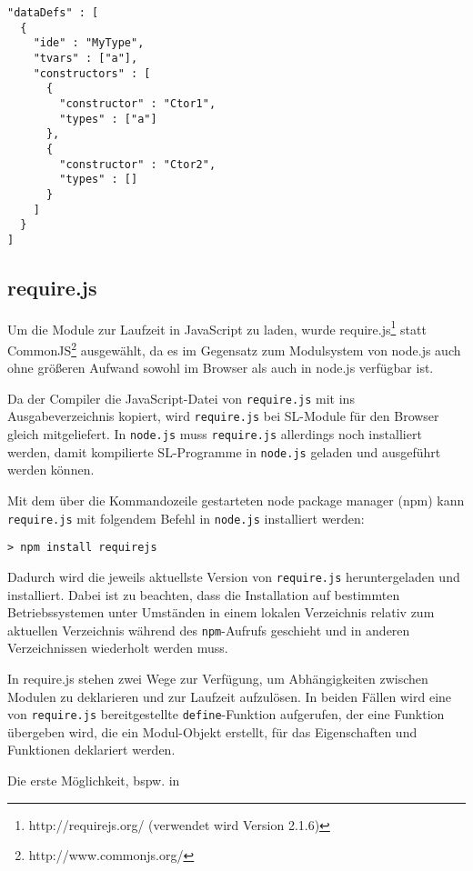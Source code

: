 \documentclass[runningheads]{llncs}
\begin{document}
\begin{verbatim}
"dataDefs" : [
  {
    "ide" : "MyType",
    "tvars" : ["a"],
    "constructors" : [
      {
        "constructor" : "Ctor1",
        "types" : ["a"]
      },
      {
        "constructor" : "Ctor2",
        "types" : []
      }
    ]
  }
]
\end{verbatim}

\subsection{require.js}
\label{sec:compReq}

Um die Module zur Laufzeit in JavaScript zu laden, wurde
require.js\footnote{http://requirejs.org/ (verwendet wird Version 2.1.6)}
statt CommonJS\footnote{http://www.commonjs.org/} ausgewählt, da es im
Gegensatz zum Modulsystem von node.js auch ohne größeren Aufwand
sowohl im Browser als auch in node.js verfügbar ist.

Da der Compiler die JavaScript-Datei von \texttt{require.js} mit ins
Ausgabeverzeichnis kopiert, wird \texttt{require.js} bei SL-Module
für den Browser gleich mitgeliefert. In \texttt{node.js} muss
\texttt{require.js} allerdings noch installiert werden, damit
kompilierte SL-Programme in \texttt{node.js} geladen und ausgeführt
werden können.

Mit dem über die Kommandozeile gestarteten node package manager (npm) kann
\texttt{require.js} mit folgendem Befehl in \texttt{node.js}
installiert werden:

\begin{verbatim}
> npm install requirejs
\end{verbatim}

Dadurch wird die jeweils aktuellste Version von \texttt{require.js} heruntergeladen
und installiert. Dabei ist zu beachten, dass die Installation auf
bestimmten Betriebssystemen unter Umständen in einem lokalen Verzeichnis
relativ zum aktuellen Verzeichnis während des \texttt{npm}-Aufrufs
geschieht und in anderen Verzeichnissen wiederholt werden muss.

In require.js stehen zwei Wege zur Verfügung, um Abhängigkeiten zwischen
Modulen zu deklarieren und zur Laufzeit aufzulösen. In beiden Fällen
wird eine von \texttt{require.js} bereitgestellte
\texttt{define}-Funktion aufgerufen, der eine Funktion übergeben wird,
die ein Modul-Objekt erstellt, für das Eigenschaften und Funktionen
deklariert werden.

Die erste Möglichkeit, bspw. in
\end{document}
